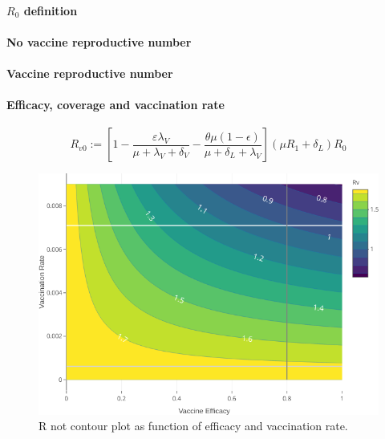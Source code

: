 \paragraph{$R_0$ definition}
\paragraph{No  vaccine reproductive number}
\paragraph{Vaccine reproductive number}
\paragraph{Efficacy, coverage and vaccination rate}



\begin{equation*}
 R_{v0} := \left[ 1-\frac{\varepsilon \lambda_V}
 {\mu+\lambda_V+\delta_V}
 -\frac{\theta\mu(1-\epsilon)}{\mu+\delta_L+\lambda_V}\right]
 (\mu R_1+\delta_L)R_0
\end{equation*}
\begin{figure}[tbh]
    \centering
    \includegraphics[scale=2.1, keepaspectratio]{Figures/R0_contour_1}
    \caption{R not contour plot as function of efficacy and vaccination rate.}
    \label{fig:r0contour1}
\end{figure}


